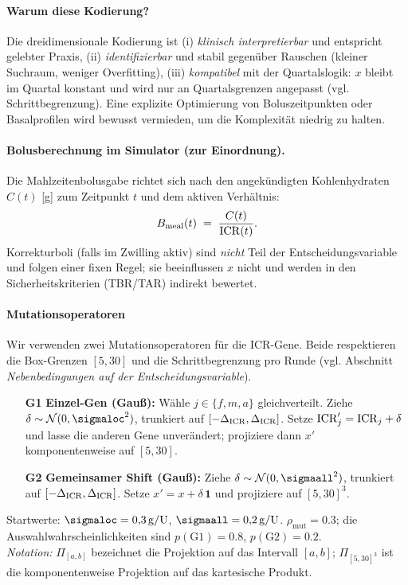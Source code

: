 \paragraph{Warum diese Kodierung?}
Die dreidimensionale Kodierung ist (i) \emph{klinisch interpretierbar} und entspricht gelebter Praxis, (ii) \emph{identifizierbar} und stabil gegen\"uber Rauschen (kleiner Suchraum, weniger Overfitting), (iii) \emph{kompatibel} mit der Quartalslogik: \(x\) bleibt im Quartal konstant und wird nur an Quartalsgrenzen angepasst (vgl. Schrittbegrenzung). Eine explizite Optimierung von Boluszeitpunkten oder Basalprofilen wird bewusst vermieden, um die Komplexit\"at niedrig zu halten.

\paragraph{Bolusberechnung im Simulator (zur Einordnung).}
Die Mahlzeitenbolusgabe richtet sich nach den angek\"undigten Kohlenhydraten \(C(t)\) [g] zum Zeitpunkt \(t\) und dem aktiven Verh\"altnis: \[B_{\mathrm{meal}}(t)\;=\;\frac{C(t)}{\mathrm{ICR}(t)}.\] Korrekturboli (falls im Zwilling aktiv) sind \emph{nicht} Teil der Entscheidungsvariable und folgen einer fixen Regel; sie beeinflussen \(x\) nicht und werden in den Sicherheitskriterien (TBR/TAR) indirekt bewertet.


\paragraph{Mutationsoperatoren}
Wir verwenden zwei Mutationsoperatoren für die ICR-Gene. Beide respektieren die Box-Grenzen \([5,30]\) und die Schrittbegrenzung pro Runde (vgl. Abschnitt \emph{Nebenbedingungen auf der Entscheidungsvariable}).
\begin{itemize}
  \item[\textbf{G1}] \textbf{Einzel-Gen (Gauß):} Wähle \(j\in\{f,m,a\}\) gleichverteilt. Ziehe \(\delta \sim \mathcal N(0,\sigmaloc^{2})\), trunkiert auf \([-\Delta_{\mathrm{ICR}},\Delta_{\mathrm{ICR}}]\). Setze \(\mathrm{ICR}'_j=\mathrm{ICR}_j+\delta\) und lasse die anderen Gene unverändert; projiziere dann \(x'\) komponentenweise auf \([5,30]\).
  \item[\textbf{G2}] \textbf{Gemeinsamer Shift (Gauß):} Ziehe \(\delta \sim \mathcal N(0,\sigmaall^{2})\), trunkiert auf \([-\Delta_{\mathrm{ICR}},\Delta_{\mathrm{ICR}}]\). Setze \(x' = x + \delta\,\mathbf{1}\) und projiziere auf \([5,30]^3\).
\end{itemize}
Startwerte: \(\sigmaloc=0{,}3\,\mathrm{g/U}\), \(\sigmaall=0{,}2\,\mathrm{g/U}\).
\(\rho_{\mathrm{mut}}=0.3\); die Auswahlwahrscheinlichkeiten sind \(p(\text{G1})=0.8\), \(p(\text{G2})=0.2\).\\
\emph{Notation:} \(\Pi_{[a,b]}\) bezeichnet die Projektion auf das Intervall \([a,b]\); \(\Pi_{[5,30]^3}\) ist die komponentenweise Projektion auf das kartesische Produkt.

